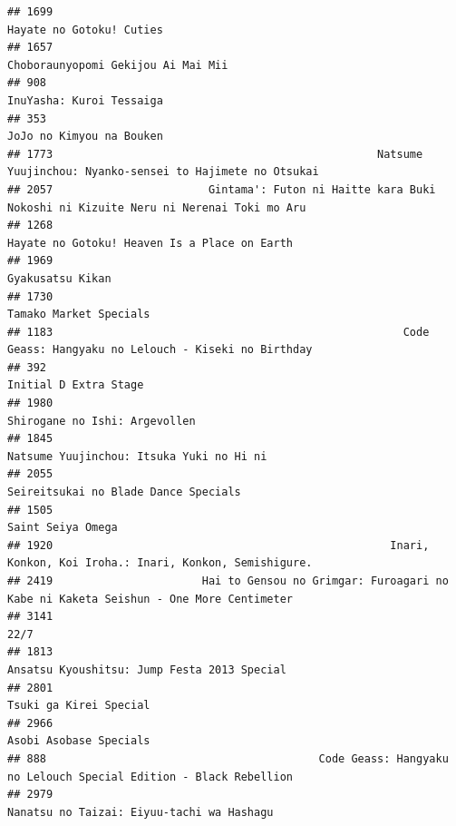 \documentclass[
]{article}
\begin{document}
\begin{verbatim}
## 1699                                                                                  Hayate no Gotoku! Cuties
## 1657                                                                        Choboraunyopomi Gekijou Ai Mai Mii
## 908                                                                                   InuYasha: Kuroi Tessaiga
## 353                                                                                   JoJo no Kimyou na Bouken
## 1773                                                  Natsume Yuujinchou: Nyanko-sensei to Hajimete no Otsukai
## 2057                        Gintama': Futon ni Haitte kara Buki Nokoshi ni Kizuite Neru ni Nerenai Toki mo Aru
## 1268                                                              Hayate no Gotoku! Heaven Is a Place on Earth
## 1969                                                                                          Gyakusatsu Kikan
## 1730                                                                                    Tamako Market Specials
## 1183                                                      Code Geass: Hangyaku no Lelouch - Kiseki no Birthday
## 392                                                                                      Initial D Extra Stage
## 1980                                                                             Shirogane no Ishi: Argevollen
## 1845                                                                  Natsume Yuujinchou: Itsuka Yuki no Hi ni
## 2055                                                                      Seireitsukai no Blade Dance Specials
## 1505                                                                                         Saint Seiya Omega
## 1920                                                    Inari, Konkon, Koi Iroha.: Inari, Konkon, Semishigure.
## 2419                       Hai to Gensou no Grimgar: Furoagari no Kabe ni Kaketa Seishun - One More Centimeter
## 3141                                                                                                      22/7
## 1813                                                               Ansatsu Kyoushitsu: Jump Festa 2013 Special
## 2801                                                                                    Tsuki ga Kirei Special
## 2966                                                                                    Asobi Asobase Specials
## 888                                          Code Geass: Hangyaku no Lelouch Special Edition - Black Rebellion
## 2979                                                                 Nanatsu no Taizai: Eiyuu-tachi wa Hashagu

\end{verbatim}
\end{document}

